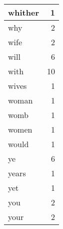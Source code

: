\begin{center}
\begin{longtable}{l|r}
whither & 1 \\ \hline
why & 2 \\ \hline
wife & 2 \\ \hline
will & 6 \\ \hline
with & 10 \\ \hline
wives & 1 \\ \hline
woman & 1 \\ \hline
womb & 1 \\ \hline
women & 1 \\ \hline
would & 1 \\ \hline
ye & 6 \\ \hline
years & 1 \\ \hline
yet & 1 \\ \hline
you & 2 \\ \hline
your & 2 \\ \hline
\end{longtable}
\end{center}



\normalsize



